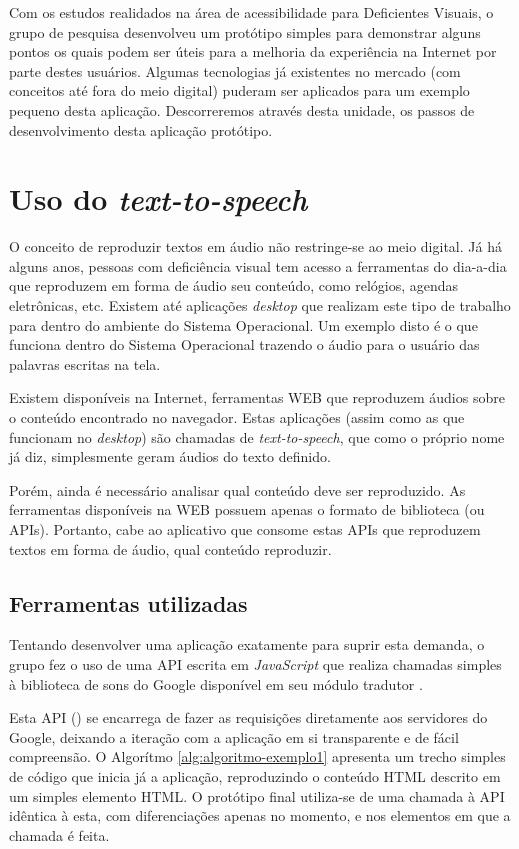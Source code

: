 \documentclass[
	12pt,				%
	oneside,			%
	a4paper,			%
	english,			%
	brazil				%
	]{abntex2ppgsi}
\begin{document}
Com os estudos realidados na área de acessibilidade para Deficientes Visuais, o grupo de pesquisa desenvolveu um protótipo simples para demonstrar alguns pontos os quais podem ser úteis para a melhoria da experiência na Internet por parte destes usuários. Algumas tecnologias já existentes no mercado (com conceitos até fora do meio digital) puderam ser aplicados para um exemplo pequeno desta aplicação. Descorreremos através desta unidade, os passos de desenvolvimento desta aplicação protótipo.

\section{Uso do \textit{text-to-speech}}

O conceito de reproduzir textos em áudio não restringe-se ao meio digital. Já há alguns anos, pessoas com deficiência visual tem acesso a ferramentas do dia-a-dia que reproduzem em forma de áudio seu conteúdo, como relógios, agendas eletrônicas, etc. Existem até aplicações \textit{desktop} que realizam este tipo de trabalho para dentro do ambiente do Sistema Operacional. Um exemplo disto é o  que funciona dentro do Sistema Operacional trazendo o áudio para o usuário das palavras escritas na tela. 

Existem disponíveis na Internet, ferramentas WEB que reproduzem áudios sobre o conteúdo encontrado no navegador. Estas aplicações (assim como as que funcionam no \textit{desktop}) são chamadas de \textit{text-to-speech}, que como o próprio nome já diz, simplesmente geram áudios do texto definido.

Porém, ainda é necessário analisar qual conteúdo deve ser reproduzido. As ferramentas disponíveis na WEB possuem apenas o formato de biblioteca (ou APIs). Portanto, cabe ao aplicativo que consome estas APIs que reproduzem textos em forma de áudio, qual conteúdo reproduzir.

\subsection{Ferramentas utilizadas}

Tentando desenvolver uma aplicação exatamente para suprir esta demanda, o grupo fez o uso de uma API escrita em \textit{JavaScript} que realiza chamadas simples à biblioteca de sons do Google disponível em seu módulo tradutor \cite{google_translate}.

Esta API () se encarrega de fazer as requisições diretamente aos servidores do Google, deixando a iteração com a aplicação em si transparente e de fácil compreensão. O Algorítmo  \ref{alg:algoritmo-exemplo1} apresenta um trecho simples de código que inicia já a aplicação, reproduzindo o conteúdo HTML descrito em um simples elemento HTML. O protótipo final utiliza-se de uma chamada à API idêntica à esta, com diferenciações apenas no momento, e nos elementos em que a chamada é feita.
\end{document}
